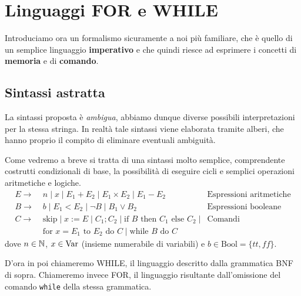\section{Linguaggi FOR e WHILE}
Introduciamo ora un formalismo sicuramente a noi più familiare,
che è quello di un semplice linguaggio \textbf{imperativo} e
che quindi riesce ad esprimere i concetti di \textbf{memoria}
e di \textbf{comando}.

\subsection{Sintassi astratta}
La sintassi proposta è \emph{ambigua}, abbiamo dunque diverse
possibili interpretazioni per la stessa stringa. In realtà
tale sintassi viene elaborata tramite alberi, che hanno proprio
il compito di eliminare eventuali ambiguità.

Come vedremo a breve si tratta di una sintassi molto semplice,
comprendente costrutti condizionali di base, la possibilità
di eseguire cicli e semplici operazioni aritmetiche e logiche.
\begin{align*}
	E \to                                                 &
	\; n \; | \; x \; | \; E_1 + E_2 \; | \;
	E_1 \times E_2 \; | \; E_1 - E_2
	                                                      &
	\text{Espressioni aritmetiche}                          \\
	B \to                                                 &
	\; b \; | \; E_1 < E_2 \; | \; \lnot B \; | \;
	B_1 \lor B_2
	                                                      &
	\text{Espressioni booleane}                             \\
	C\to                                                  &
	\; \text{skip} \; | \; x := E \; | \; C_1 ; C_2 \; | \;
	\text{if } B \text{ then } C_1 \text{ else } C_2 \; | &
	\text{Comandi}                                          \\ &
	\; \text{for } x = E_1 \text{ to } E_2 \text{ do } C \; |
	\; \text{while } B \text{ do } C
\end{align*}
dove $n \in \mathbb{N}$, $x \in \operatorname{Var}$ (insieme numerabile di
variabili) e $b \in \text{Bool} = \{ tt, ff \}$.

D'ora in poi chiameremo WHILE, il linguaggio descritto dalla
grammatica BNF di sopra. Chiameremo invece FOR, il linguaggio
risultante dall'omissione del comando \verb|while| della
stessa grammatica.

